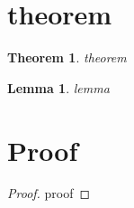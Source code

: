 \documentclass{article}
\newtheorem{theorem}{Theorem}
\newtheorem{lemma}{Lemma}
\newtheorem{proof}{Proof}[section]
\begin{document}
\section{theorem}
\begin{theorem}
theorem
\end{theorem}
\begin{lemma}
lemma
\end{lemma}
\section{Proof}
\begin{proof}
proof
\end{proof}
\end{document}
